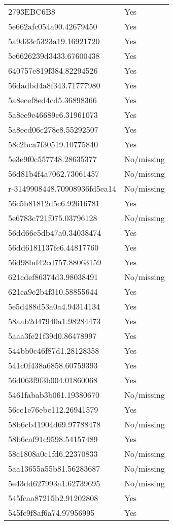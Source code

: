 \begin{tabular}{ll}
2793EBC6B8 & Yes \\
5e662afc054a90.42679450 & Yes \\
5a9d33c5323a19.16921720 & Yes \\
5e6626239d3433.67600438 & Yes \\
640757e819f384.82294526 & Yes \\
56dadbd4a8f343.71777980 & Yes \\
5a8ecef8ed4cd5.36898366 & Yes \\
5a8ec9e46689c6.31961073 & Yes \\
5a8ecd06c278e8.55292507 & Yes \\
58c2bca7f30519.10775840 & Yes \\
5e3e9f0c557748.28635377 & No/missing \\
56d81b4f4a7062.73061457 & No/missing \\
r-3149908448.70908936fd5ea14 & No/missing \\
56c5b81812d5c6.92616781 & Yes \\
5e6783c721f075.03796128 & No/missing \\
56dd66e5db47a0.34038474 & Yes \\
56dd6181137fe6.44817760 & Yes \\
56d98bd42cd757.88063159 & Yes \\
621cdef86374d3.98038491 & No/missing \\
621ca9e2b4f310.58855644 & Yes \\
5e5d488d53a0a4.94314134 & Yes \\
58aab2d47940a1.98284473 & Yes \\
5aaa3fe21f39d0.86478997 & Yes \\
544bb0c46f87d1.28128358 & Yes \\
541c0f438a6858.60759393 & Yes \\
56d063f9f3b004.01860068 & Yes \\
5461fabab3b061.19380670 & No/missing \\
56cc1e76ebc112.26941579 & Yes \\
58b6cb41904d69.97788478 & No/missing \\
58b6caf91c9598.54157489 & Yes \\
58c1808a0c1fd6.22370833 & No/missing \\
5aa13655a55b81.56283687 & No/missing \\
5e43dd627993a1.62739695 & No/missing \\
545fcaa87215b2.91202808 & Yes \\
545fc9f8af6a74.97956995 & Yes \\

\end{tabular}
